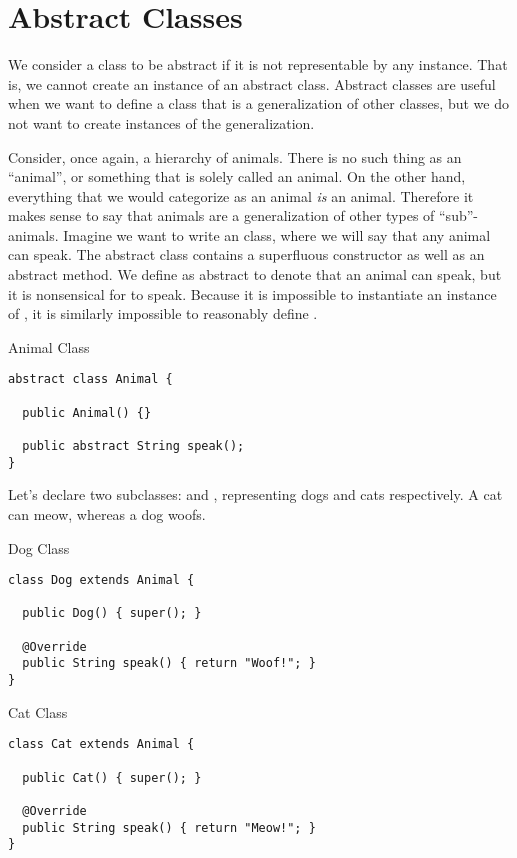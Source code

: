 \section{Abstract Classes}

We consider a class to be abstract if it is not representable by any instance. That is, we cannot create an instance of an abstract class. Abstract classes are useful when we want to define a class that is a generalization of other classes, but we do not want to create instances of the generalization.

\example Consider, once again, a hierarchy of animals. There is no such thing as an ``animal'', or something that is solely called an animal. On the other hand, everything that we would categorize as an animal \textit{is} an animal. Therefore it makes sense to say that animals are a generalization of other types of ``sub''-animals. Imagine we want to write an  class, where we will say that any animal can speak. The abstract class contains a superfluous constructor as well as an abstract  method. We define  as abstract to denote that an animal can speak, but it is nonsensical for  to speak. Because it is impossible to instantiate an instance of , it is similarly impossible to reasonably define .

\begin{cl}{Animal Class}
\begin{lstlisting}[language=MyJava]
abstract class Animal {

  public Animal() {} 

  public abstract String speak();
}
\end{lstlisting}
\end{cl}

Let's declare two subclasses:  and , representing dogs and cats respectively. A cat can meow, whereas a dog woofs. 

\begin{cl}{Dog Class}
\begin{lstlisting}[language=MyJava]
class Dog extends Animal {

  public Dog() { super(); }

  @Override
  public String speak() { return "Woof!"; }
}
\end{lstlisting}
\end{cl}

\begin{cl}{Cat Class}
\begin{lstlisting}[language=MyJava]
class Cat extends Animal {

  public Cat() { super(); }

  @Override
  public String speak() { return "Meow!"; }
}
\end{lstlisting}
\end{cl}

